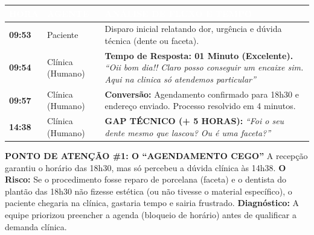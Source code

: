 \documentclass[a4paper,11pt]{article}
\begin{document}
\begin{tcolorbox}[enhanced, frame hidden, colback=white]
    \renewcommand{\arraystretch}{1.5}
    \begin{tabular}{ | p{} | p{} | p{} | }
        \hline
        \rowcolor{infoDentalTeal}
        \textbf{\textcolor{white}{HORA}} & \textbf{\textcolor{white}{AGENTE}} & \textbf{\textcolor{white}{ANÁLISE DE FLUXO E TEMPO}} \\
        \hline
        \textbf{09:53} & Paciente &
        \small Disparo inicial relatando dor, urgência e dúvida técnica (dente ou faceta). \\
        \hline
        \textbf{09:54} & Clínica (Humano) &
        \textbf{Tempo de Resposta: 01 Minuto (Excelente).} \newline
        \textit{``Oii bom dia!! Claro posso conseguir um encaixe sim. Aqui na clinica só atendemos particular''} \\
        \hline
        \textbf{09:57} & Clínica (Humano) &
        \textbf{Conversão:} Agendamento confirmado para 18h30 e endereço enviado. Processo resolvido em 4 minutos. \\
        \hline
        \textbf{14:38} & Clínica (Humano) &
        \textbf{\textcolor{infoDentalRed}{GAP TÉCNICO (+ 5 HORAS):}} \newline
        \textit{``Foi o seu dente mesmo que lascou? Ou é uma faceta?''} \\
        \hline
    \end{tabular}
\end{tcolorbox}

\begin{tcolorbox}[colback=infoDentalOrange!5, colframe=infoDentalOrange, boxrule=0.5pt, arc=0mm, left=2mm, right=2mm]
    \textbf{\textcolor{infoDentalOrange}{PONTO DE ATENÇÃO \#1: O ``AGENDAMENTO CEGO''}}
    \footnotesize
    A recepção garantiu o horário das 18h30, mas só percebeu a dúvida clínica às 14h38.
    \textbf{O Risco:} Se o procedimento fosse reparo de porcelana (faceta) e o dentista do plantão das 18h30 não fizesse estética (ou não tivesse o material específico), o paciente chegaria na clínica, gastaria tempo e sairia frustrado.
    \textbf{Diagnóstico:} A equipe priorizou preencher a agenda (bloqueio de horário) antes de qualificar a demanda clínica.
\end{tcolorbox}
\vspace{0.2cm}
\end{document}
